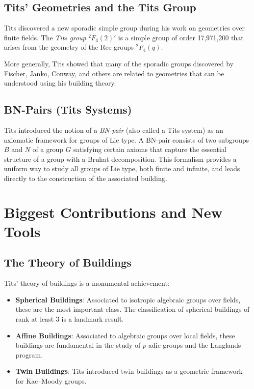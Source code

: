 \subsection{Tits' Geometries and the Tits Group}

Tits discovered a new sporadic simple group during his work on geometries over finite fields. The \emph{Tits group} $^2F_4(2)'$ is a simple group of order 17,971,200 that arises from the geometry of the Ree groups $^2F_4(q)$.

More generally, Tits showed that many of the sporadic groups discovered by Fischer, Janko, Conway, and others are related to geometries that can be understood using his building theory.

\subsection{BN-Pairs (Tits Systems)}

Tits introduced the notion of a \emph{BN-pair} (also called a Tits system) as an axiomatic framework for groups of Lie type. A BN-pair consists of two subgroups $B$ and $N$ of a group $G$ satisfying certain axioms that capture the essential structure of a group with a Bruhat decomposition. This formalism provides a uniform way to study all groups of Lie type, both finite and infinite, and leads directly to the construction of the associated building.

\section{Biggest Contributions and New Tools}

\subsection{The Theory of Buildings}

Tits' theory of buildings is a monumental achievement:

\begin{itemize}
\item \textbf{Spherical Buildings}: Associated to isotropic algebraic groups over fields, these are the most important class. The classification of spherical buildings of rank at least 3 is a landmark result.

\item \textbf{Affine Buildings}: Associated to algebraic groups over local fields, these buildings are fundamental in the study of $p$-adic groups and the Langlands program.

\item \textbf{Twin Buildings}: Tits introduced twin buildings as a geometric framework for Kac--Moody groups.
\end{itemize}

